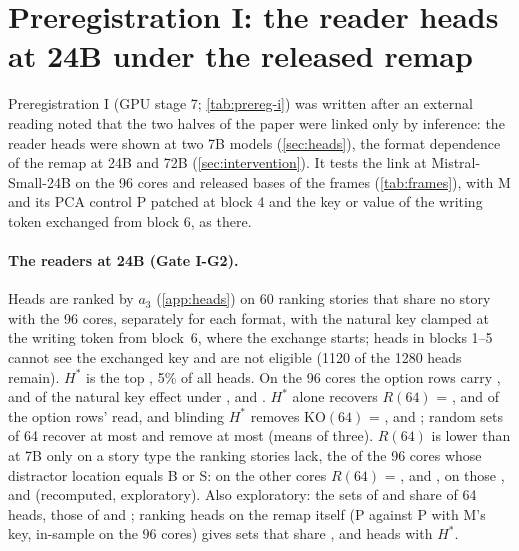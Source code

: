 \clearpage
\section{Preregistration I: the reader heads at 24B under the released remap}\label{app:stage7}

Preregistration I (GPU stage 7; \cref{tab:prereg-i}) was written after an external reading noted that the two halves of the paper were linked only by inference: the reader heads were shown at two 7B models (\cref{sec:heads}), the format dependence of the remap at 24B and 72B (\cref{sec:intervention}). It tests the link at Mistral-Small-24B on the 96 cores and released bases of the frames (\cref{tab:frames}), with M and its PCA control P patched at block 4 and the key or value of the writing token exchanged from block 6, as there.

\paragraph{The readers at 24B (Gate I-G2).} Heads are ranked by $a_3$ (\cref{app:heads}) on 60 ranking stories that share no story with the 96 cores, separately for each format, with the natural key clamped at the writing token from block~6, where the exchange starts; heads in blocks 1--5 cannot see the exchanged key and are not eligible (1120 of the 1280 heads remain). $H^*$ is the top \Ikstar{}, 5\% of all heads. On the 96 cores the option rows carry \IgtwoRatioOpt{}, \IgtwoRatioLetter{} and \IgtwoRatioPost{} of the natural key effect under \fmtOpt{}, \fmtLetter{} and \fmtPost{}. $H^*$ alone recovers $R(64)$ = \IgtwoROpt{}, \IgtwoRLetter{} and \IgtwoRPost{} of the option rows' read, and blinding $H^*$ removes $\mathrm{KO}(64)$ = \IgtwoKOOpt{}, \IgtwoKOLetter{} and \IgtwoKOPost{}; random sets of 64 recover at most \IgtwoRrandPost{} and remove at most \IgtwoKOrandPost{} (means of three). $R(64)$ is lower than at 7B only on a story type the ranking stories lack, the \InDist{} of the 96 cores whose distractor location equals B or S: on the other cores $R(64)$ = \IrSixtyfourRestOpt{}, \IrSixtyfourRestLetter{} and \IrSixtyfourRestPost{}, on those \IrSixtyfourDistOpt{}, \IrSixtyfourDistLetter{} and \IrSixtyfourDistPost{} (recomputed, exploratory). Also exploratory: the sets of \fmtOpt{} and \fmtLetter{} share \IxOverlapOptLetter{} of 64 heads, those of \fmtOpt{} and \fmtPost{} \IxOverlapOptPost{}; ranking heads on the remap itself (P against P with M's key, in-sample on the 96 cores) gives sets that share \IremOverlapOpt{}, \IremOverlapLetter{} and \IremOverlapPost{} heads with $H^*$.

